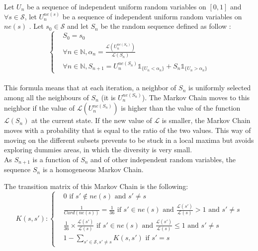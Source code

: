 Let $U_n$ be a sequence of independent uniform random variables on $[0, 1]$ and $\forall s \in \mathcal{S}$, let $U_{n}^{ne(s)}$ be a sequence of independent uniform random variables on $ne(s)$ .
Let $s_0 \in \mathcal{S}$ and let  $S_n$ be the random sequence defined as follow : \\


\[
 \left\{
    \begin{aligned}
        & S_0 = s_0 \\
        & \forall n \in \mathbb{N}, \alpha_n = \frac{\mathcal{L}(U_{n}^{ne(S_n)})}{\mathcal{L}(S_n)} \\
        & \forall n \in \mathbb{N}, S_{n+1} = U_{n}^{ne(S_n)} \mathbb{1}_{\{U_n < \alpha_n\}} + S_n \mathbb{1}_{\{U_n > \alpha_n\}}
\end{aligned}
\right.
\]
\\[0.5cm]

This formula means that at each iteration, a neighbor  of $S_n$ is uniformly selected among all the neighbours of $S_n$ (it is $U_n^{ne(S_n)}$). 
The Markov Chain moves to this neighbor  if the value of  $\mathcal{L}(U_n^{ne(S_n)})$ is higher than the value of the function $\mathcal{L}(S_n)$ at the current state.
If the new value of $\mathcal{L}$ is smaller, the Markov Chain moves with a probability that is equal to the ratio of the two values.
This way of moving on the different subsets prevents to be stuck in a local maxima but avoids exploring dummies areas, in which the diversity is very small. \\
As $S_{n+1}$ is a function of $S_n$ and of other independent random variables, the sequence $S_n$ is a homogeneous Markov Chain.

The transition matrix of this Markov Chain is the following: 
\[
K(s, s'): \left\{
\begin{aligned}
& 0 \text{ if } s' \notin ne(s) \text{ and } s' \neq s   \\
& \frac{1}{Card(ne(s))} = \frac{1}{36} \text{ if } s' \in ne(s) \text{ and } \frac{\mathcal{L}(s')}{\mathcal{L}(s)} > 1 \text{ and } s' \neq s \\
& \frac{1}{36} \times \frac{\mathcal{L}(s')}{\mathcal{L}(s)} \text{ if } s' \in ne(s) \text{ and } \frac{\mathcal{L}(s')}{\mathcal{L}(s)} \leq 1  \text{ and } s' \neq s  \\
& 1 - \sum_{s' \in \mathcal{S}, s' \neq s}K(s, s') \text{ if } s' = s 
\end{aligned}
\right.
\]
\\[0.3cm]

